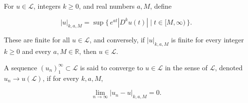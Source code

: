 For $u \in \mathcal{L}$, integers $k \geq 0$, and real numbers $a, M$, define

$$|u|_{k,a,M} = \sup \{\, e^{at} |D^{k} u(t)| \mid t \in [M, \infty) \,\}.$$

These are finite for all $u \in \mathcal{L}$, and conversely, if $|u|_{k,a,M}$ is finite for every integer $k \geq 0$ and every $a, M \in \mathbb{R}$, then $u \in \mathcal{L}$.

A sequence $(u_n)_{1}^{\infty} \subset \mathcal{L}$ is said to converge to $u \in \mathcal{L}$ in the sense of $\mathcal{L}$, denoted $u_n \to u (\mathcal{L})$, if for every $k, a, M$,

$$\lim_{n \to \infty} |u_n - u|_{k,a,M} = 0.$$
